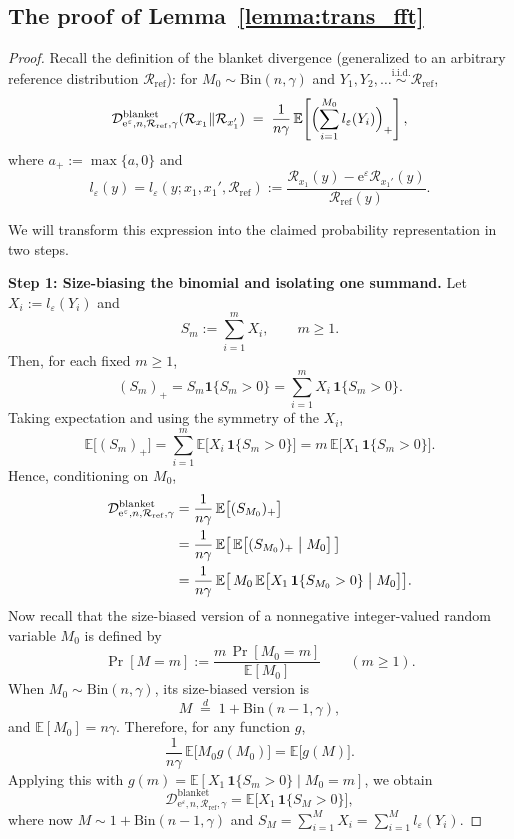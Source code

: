 \documentclass{article}
\theoremstyle{plain}
\theoremstyle{definition}
\begin{document}
\subsection{The proof of Lemma~\ref{lemma:trans_fft}}
\label{app:proof-blanket-transform-fft}

\blankettransformfft*

\begin{proof}
Recall the definition of the blanket divergence (generalized to an
arbitrary reference distribution $\mathcal R_{\mathrm{ref}}$):
for $M_0 \sim \mathrm{Bin}(n,\gamma)$ and
$Y_1,Y_2,\dots \stackrel{\mathrm{i.i.d.}}{\sim}\mathcal R_{\mathrm{ref}}$,
\[
  \mathcal{D}_{\mathrm{e}^\varepsilon,n,\mathcal{R}_\mathrm{ref},\gamma}^\text{blanket}(\mathcal{R}_{x_1} \| \mathcal{R}_{x_1^\prime})
  \;=\;
  \frac{1}{n\gamma}
  \,\mathbb{E}\!\left[
    \Bigl( \sum_{i=1}^{M_0} l_\varepsilon(Y_i) \Bigr)_{+}
  \right],
\]
where $a_+ := \max\{a,0\}$ and
\[
  l_{\varepsilon}(y)
  = l_{\varepsilon}(y;x_1,x_1',\mathcal R_{\mathrm{ref}})
  := \frac{\mathcal R_{x_1}(y)-\mathrm e^\varepsilon \mathcal R_{x_1'}(y)}
           {\mathcal R_{\mathrm{ref}}(y)}.
\]

We will transform this expression into the claimed probability
representation in two steps.

\medskip\noindent
\textbf{Step 1: Size-biasing the binomial and isolating one summand.}
Let $X_i := l_\varepsilon(Y_i)$ and
\[
  S_m := \sum_{i=1}^m X_i, \qquad m\ge1.
\]
Then, for each fixed $m\ge1$,
\[
  (S_m)_+ = S_m \mathbf 1\{S_m>0\}
  = \sum_{i=1}^m X_i\,\mathbf 1\{S_m>0\}.
\]
Taking expectation and using the symmetry of the $X_i$,
\[
  \mathbb E\bigl[(S_m)_+\bigr]
  = \sum_{i=1}^m \mathbb E\bigl[X_i\,\mathbf 1\{S_m>0\}\bigr]
  = m\,\mathbb E\bigl[X_1\,\mathbf 1\{S_m>0\}\bigr].
\]
Hence, conditioning on $M_0$,
\begin{align*}
  \mathcal{D}_{\mathrm{e}^\varepsilon,n,\mathcal{R}_\mathrm{ref},\gamma}^\text{blanket}
  &= \frac{1}{n\gamma}\,
     \mathbb{E}\bigl[ (S_{M_0})_+ \bigr] \\
  &= \frac{1}{n\gamma}\,
     \mathbb E\bigl[\,\mathbb E\bigl[(S_{M_0})_+\bigm|M_0\bigr]\,\bigr] \\
  &= \frac{1}{n\gamma}\,
     \mathbb E\bigl[\,M_0\,
       \mathbb E\bigl[X_1\,\mathbf 1\{S_{M_0}>0\}\bigm|M_0\bigr]
     \bigr].
\end{align*}
Now recall that the size-biased version of a nonnegative integer-valued
random variable $M_0$ is defined by
\[
  \Pr[M=m]
  := \frac{m\,\Pr[M_0=m]}{\mathbb E[M_0]}\qquad(m\ge1).
\]
When $M_0\sim\mathrm{Bin}(n,\gamma)$, its size-biased version is
\[
  M \;\stackrel{d}{=}\; 1+\mathrm{Bin}(n-1,\gamma),
\]
and $\mathbb E[M_0] = n\gamma$.
Therefore, for any function $g$,
\[
  \frac{1}{n\gamma}\,\mathbb E\bigl[M_0 g(M_0)\bigr]
  = \mathbb E\bigl[g(M)\bigr].
\]
Applying this with
$g(m) = \mathbb E[X_1\,\mathbf 1\{S_m>0\}\mid M_0=m]$, we obtain
\[
  \mathcal{D}_{\mathrm{e}^\varepsilon,n,\mathcal{R}_\mathrm{ref},\gamma}^\text{blanket}
  = \mathbb E\bigl[
      X_1\,\mathbf 1\{S_M>0\}
    \bigr],
\]
where now $M\sim 1+\mathrm{Bin}(n-1,\gamma)$ and
$S_M = \sum_{i=1}^M X_i = \sum_{i=1}^M l_\varepsilon(Y_i)$.


\end{proof}
\end{document}
